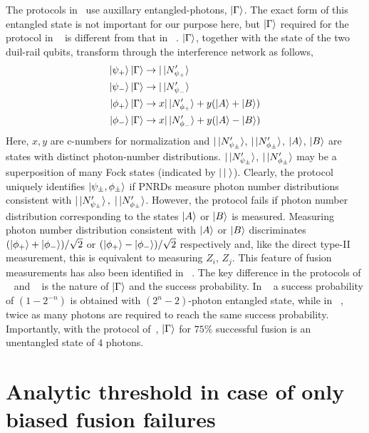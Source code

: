 \documentclass[reprint,
groupedaddress,
 prl,amsmath,amssymb,
 aps]{revtex4-2}
\theoremstyle{definition}
\begin{document}
\begin{bibunit}
The protocols in~\cite{grice2011arbitrarily,ewert20143} use auxillary entangled-photons, $\ket{\Gamma}$. The exact form of this entangled state is not important for our purpose here, but $\ket{\Gamma}$ required for the protocol in ~\cite{grice2011arbitrarily} is different from that in ~\cite{ewert20143}. $\ket{\Gamma}$, together with the state of the two duil-rail qubits, transform through the interference network as follows,
\begin{equation}
   \begin{aligned}
\ket{\psi_+}\ket{\Gamma}&\rightarrow |\ket{N'_{\psi_+}}\\
\ket{\psi_-}\ket{\Gamma}&\rightarrow |\ket{N'_{\psi_-}}\\
\ket{\phi_+}\ket{\Gamma}&\rightarrow x|\ket{N'_{\phi_+}}+y(\ket{A}+\ket{B})\\
\ket{\phi_-}\ket{\Gamma}&\rightarrow x|\ket{N'_{\phi_-}}+y(\ket{A}-\ket{B})
\end{aligned} 
\end{equation}
Here, $x,y$ are c-numbers for normalization and $|\ket{N'_{\psi_\pm}}$, $|\ket{N'_{\phi_\pm}}$, $\ket{A}$, $\ket{B}$ are states with distinct photon-number distributions. $|\ket{N'_{\psi_\pm}}$, $|\ket{N'_{\phi_\pm}}$ may be a superposition of many Fock states (indicated by $|\ket{\;}$). Clearly, the protocol uniquely identifies $\ket{\psi_\pm,\phi_\pm}$ if PNRDs measure photon number distributions consistent with  $|\ket{N'_{\psi_\pm}},\;|\ket{N'_{\phi_\pm}}$. However, the protocol fails if photon number distribution corresponding to the states $\ket{A}$ or $\ket{B}$ is measured. Measuring photon number distribution consistent with $\ket{A}$ or $\ket{B}$ discriminates $(\ket{\phi_+}+\ket{\phi_-})/\sqrt{2}$ or $(\ket{\phi_+}-\ket{\phi_-})/\sqrt{2}$ respectively and, like the direct type-II measurement, this is equivalent to measuring $Z_i$, $Z_j$. This feature of fusion measurements has also been identified in ~\cite{bartolucci2021fusion}. The key difference in the protocols of ~\cite{grice2011arbitrarily} and ~\cite{ewert20143} is the nature of $\ket{\Gamma}$ and the success probability. In ~\cite{grice2011arbitrarily} a success probability of $(1-2^{-n})$ is obtained with $(2^n-2)$-photon entangled state, while in ~\cite{ewert20143}, twice as many photons are required to reach the same success probability. Importantly, with the protocol of~\cite{ewert20143}, $\ket{\Gamma}$ for $75\%$ successful fusion is an unentangled state of $4$ photons. 


\section{Analytic threshold in case of only biased fusion failures}



\end{bibunit}
\end{document}
